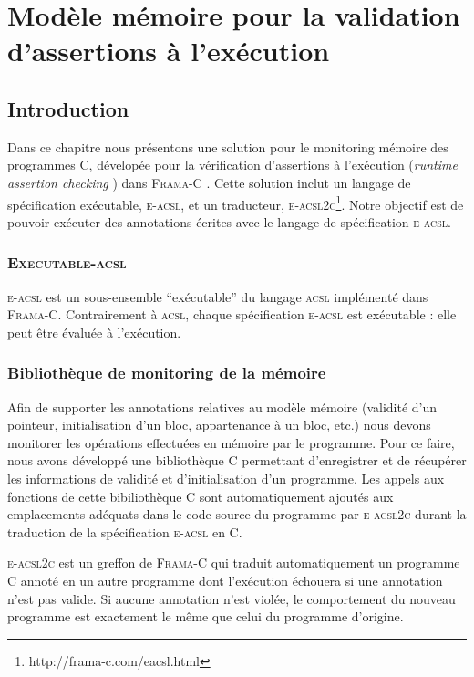 \documentclass[french]{spimufcphdthesis}
\begin{document}
\chapter{Modèle mémoire pour la validation d'assertions à l'exécution}


\section{Introduction}


Dans ce chapitre nous présentons une solution pour le monitoring mémoire des
programmes C, dévelopée pour la vérification d'assertions à l'exécution
({\em runtime assertion checking} \cite{RAC}) dans \textsc{Frama-C}
\cite{Frama-C}.
Cette solution inclut un langage de spécification exécutable, \textsc{e-acsl},
et un traducteur, \textsc{e-acsl2c}\footnote{http://frama-c.com/eacsl.html}.
Notre objectif est de pouvoir exécuter des annotations écrites avec le langage
de spécification \textsc{e-acsl}.

\subsection{\textsc{Executable-acsl}}

\textsc{e-acsl} est un sous-ensemble ``exécutable'' du langage \textsc{acsl}
implémenté dans \textsc{Frama-C}. Contrairement à \textsc{acsl}, chaque
spécification \textsc{e-acsl} est exécutable : elle peut être évaluée à
l'exécution.

\subsection{Bibliothèque de monitoring de la mémoire}

Afin de supporter les annotations relatives au modèle mémoire (validité d'un
pointeur, initialisation d'un bloc, appartenance à un bloc, etc.) nous devons
monitorer les opérations effectuées en mémoire par le programme. Pour ce faire,
nous avons développé une bibliothèque C permettant d'enregistrer et de récupérer
les informations de validité et d'initialisation d'un programme. Les appels aux
fonctions de cette bibiliothèque C sont automatiquement ajoutés aux emplacements
adéquats dans le code source du programme par \textsc{e-acsl2c} durant la
traduction de la spécification \textsc{e-acsl} en C.

\textsc{e-acsl2c} est un greffon de \textsc{Frama-C} qui traduit automatiquement
un programme C annoté en un autre programme dont l'exécution échouera si une
annotation n'est pas valide. Si aucune annotation n'est violée, le comportement
du nouveau programme est exactement le même que celui du programme d'origine.
\end{document}
